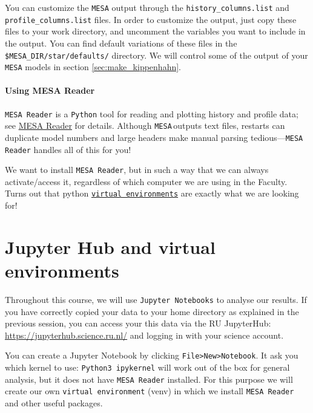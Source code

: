 \documentclass[11pt,a4paper]{article}
\newcommand{\MESA}{\texttt{MESA}\,}
\begin{document}
You can customize the \texttt{MESA} output through the \texttt{history\_columns.list} and \\
\texttt{profile\_columns.list} files. In order to customize the output, just copy these files to your work directory, and uncomment the variables you want to include in the output. You can find default variations of these files in the \texttt{\$MESA\_DIR/star/defaults/} directory. 
We will control some of the output of your \texttt{MESA} models in section \ref{sec:make_kippenhahn}.



\paragraph{Using MESA Reader}
\texttt{MESA Reader} is a \texttt{Python} tool for reading and plotting history and profile data; see \href{https://docs.mesastar.org/en/latest/using_mesa/output.html#plotting-mesa-output}{MESA Reader} for details. Although \MESA outputs text files, restarts can duplicate model numbers and large headers make manual parsing tedious—\texttt{MESA Reader} handles all of this for you!

We want to install \texttt{MESA Reader}, but in such a way that we can always activate/access it, regardless of which computer we are using in the Faculty. 
Turns out that python \href{https://virtualenv.pypa.io/en/latest/user_guide.html}{\texttt{virtual environments}} are exactly what we are looking for!




\section{Jupyter Hub and virtual environments}

Throughout this course, we will use \texttt{Jupyter Notebooks} to analyse our results. 
If you have correctly copied your data to your home directory as explained in the previous session, you can access your this data via the RU JupyterHub: \url{https://jupyterhub.science.ru.nl/} and logging in with your science account.

You can create a Jupyter Notebook by clicking \texttt{File>New>Notebook}. It ask you which kernel to use: \texttt{Python3 ipykernel} will work out of the box for general analysis, but it does not have \texttt{MESA Reader} installed. For this purpose we will create our own \texttt{virtual environment} (venv) in which we install \texttt{MESA Reader} and other useful packages.
\end{document}
